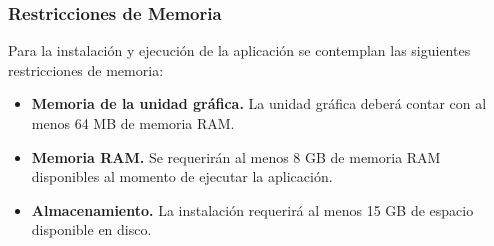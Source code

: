 \subsubsection{Restricciones de Memoria}{\color{black}
Para la instalación y ejecución de la aplicación se contemplan las siguientes restricciones de memoria:

\begin{itemize}
\item \textbf{Memoria de la unidad gráfica.} La unidad gráfica deberá contar con al menos 64 MB de memoria RAM.
\item \textbf{Memoria RAM.} Se requerirán al menos 8 GB de memoria RAM disponibles al momento de ejecutar la aplicación.
\item \textbf{Almacenamiento.} La instalación requerirá al menos 15 GB de espacio disponible en disco.
\end{itemize}
}
